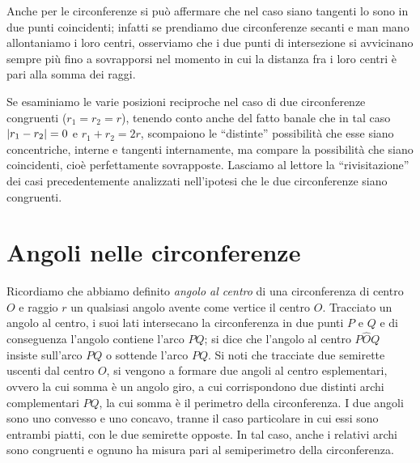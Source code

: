 Anche per le circonferenze si può affermare che nel caso siano tangenti lo sono in due punti coincidenti; infatti se prendiamo due circonferenze secanti e man mano allontaniamo i loro centri, osserviamo che i due punti di intersezione si avvicinano sempre più fino a sovrapporsi nel momento in cui la distanza fra i loro centri è pari alla somma dei raggi.

\begin{figure}[htb]
	\centering
\end{figure}

Se esaminiamo le varie posizioni reciproche nel caso di due circonferenze congruenti ($r_1 = r_2 = r$), tenendo conto anche del fatto banale che in tal caso $\valass{r_1 - r_2} = 0$ e $r_1 + r_2 = 2r$, scompaiono le ``distinte'' possibilità che esse siano concentriche, interne e tangenti internamente, ma compare la possibilità che siano coincidenti, cioè perfettamente sovrapposte.
Lasciamo al lettore la ``rivisitazione'' dei casi precedentemente analizzati nell'ipotesi che le due circonferenze siano congruenti.

\section{Angoli nelle circonferenze}\label{sect:angoli_circonferenze}

\noindent\begin{minipage}{0.6\textwidth}\parindent15pt
Ricordiamo che abbiamo definito \emph{angolo al centro} di una circonferenza di centro $O$ e raggio $r$ un qualsiasi angolo avente come vertice il centro $O$.
Tracciato un angolo al centro, i suoi lati intersecano la circonferenza in due punti $P$ e $Q$ e di conseguenza l'angolo contiene l'arco $PQ$; si dice che l'angolo al centro $P\widehat{O}Q$ insiste sull'arco $PQ$ o sottende l'arco $PQ$.
Si noti che tracciate due semirette uscenti dal centro $O$, si vengono a formare due angoli al centro esplementari, ovvero la cui somma è un angolo giro, a cui corrispondono due distinti archi complementari $PQ$, la cui somma è il perimetro della circonferenza. 
I due angoli sono uno convesso e uno concavo, tranne il caso particolare in cui essi sono entrambi piatti, con le due semirette opposte. In tal caso, anche i relativi archi sono congruenti e ognuno ha misura pari al semiperimetro della circonferenza.
\end{minipage}\hfil
\begin{minipage}{0.4\textwidth}
	\centering
\end{minipage}

